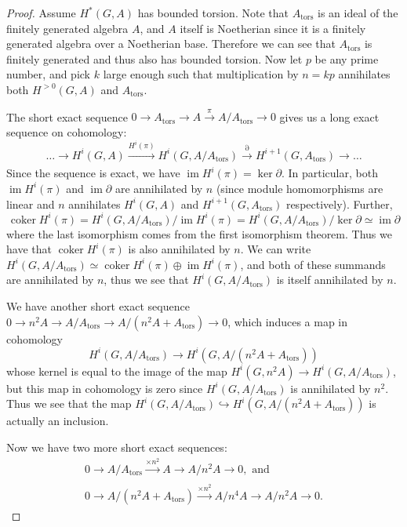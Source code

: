 \documentclass{article}
\theoremstyle{plain}
\theoremstyle{definition}
\DeclareMathOperator{\coker}{coker}
\DeclareMathOperator{\im}{im}
\DeclareMathOperator{\tors}{tors}
\begin{document}
\begin{proof}
    Assume $H^*(G, A)$ has bounded torsion. Note that $A_{\tors}$ is an ideal of the finitely generated algebra $A$, and $A$ itself is Noetherian since it is a finitely generated algebra over a Noetherian base. Therefore we can see that $A_{\tors}$ is finitely generated and thus also has bounded torsion. Now let $p$ be any prime number, and pick $k$ large enough such that multiplication by $n=kp$ annihilates both $H^{>0}(G, A)$ and $A_{\tors}$. 

    The short exact sequence $0\to A_{\tors} \to A\xrightarrow{\pi}{} A/A_{\tors}\to 0$ gives us a long exact sequence on cohomology:
    \[
    \dots \to H^i(G, A) \xrightarrow[]{H^i(\pi)} H^i(G, A/A_{\tors}) \xrightarrow[]{\partial} H^{i+1}(G, A_{\tors}) \to \dots
    \]
Since the sequence is exact, we have $\im H^i(\pi)=\ker \partial$. In particular, both $\im H^i(\pi)$ and $\im \partial$ are annihilated by $n$ (since module homomorphisms are linear and $n$ annihilates $H^i(G, A)$ and $H^{i+1}(G, A_{\tors})$ respectively). Further, 
\[
\coker H^i(\pi) = H^i(G, A/A_{\tors})/\im H^i(\pi)=  H^i(G, A/A_{\tors})/\ker \partial \simeq \im \partial
\]
where the last isomorphism comes from the first isomorphism theorem. Thus we have that $\coker H^i(\pi)$ is also annihilated by $n$. We can write $H^i(G, A/A_{\tors})\simeq \coker H^i(\pi) \oplus \im H^i(\pi)$, and both of these summands are annihilated by $n$, thus we see that $H^i(G, A/A_{\tors})$ is itself annihilated by $n$. 

We have another short exact sequence $0\to n^2A \to A/A_{\tors}\to A/(n^2A+A_{\tors})\to 0$, which induces a map in cohomology 
\[
H^i(G, A/A_{\tors}) \xrightarrow{}{} H^i(G, A/(n^2A +A_{\tors}))
\]
whose kernel is equal to the image of the map $H^i(G, n^2A)\to H^i(G, A/A_{\tors})$, but this map in cohomology is zero since $H^i(G, A/A_{\tors})$ is annihilated by $n^2$. Thus we see that the map $H^i(G, A/A_{\tors}) \hookrightarrow H^i(G, A/(n^2A +A_{\tors}))$ is actually an inclusion.

Now we have two more short exact sequences:
\begin{align*}
    0 \to A/A_{\tors} \xrightarrow[]{\times n^2}  A\to A/n^2A \to 0,  \textrm{ and } \\
    0 \to A/(n^2A +A_{\tors}) \xrightarrow[]{\times n^2} A/n^4A \to A/n^2A \to 0.
\end{align*}




\end{proof}
\end{document}
